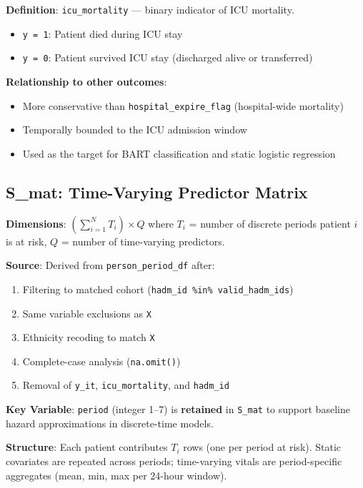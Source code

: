 \documentclass[11pt]{article}
\begin{document}
\textbf{Definition}: \texttt{icu\_mortality} --- binary indicator of ICU mortality.
\begin{itemize}[nosep]
    \item \texttt{y = 1}: Patient died during ICU stay
    \item \texttt{y = 0}: Patient survived ICU stay (discharged alive or transferred)
\end{itemize}

\textbf{Relationship to other outcomes}:
\begin{itemize}[nosep]
    \item More conservative than \texttt{hospital\_expire\_flag} (hospital-wide mortality)
    \item Temporally bounded to the ICU admission window
    \item Used as the target for BART classification and static logistic regression
\end{itemize}

\subsection{S\_mat: Time-Varying Predictor Matrix}

\textbf{Dimensions}: $\left(\sum_{i=1}^{N} T_i\right) \times Q$ where $T_i$ = number of discrete periods patient $i$ is at risk, $Q$ = number of time-varying predictors.

\textbf{Source}: Derived from \texttt{person\_period\_df} after:
\begin{enumerate}[nosep]
    \item Filtering to matched cohort (\texttt{hadm\_id \%in\% valid\_hadm\_ids})
    \item Same variable exclusions as \texttt{X}
    \item Ethnicity recoding to match \texttt{X}
    \item Complete-case analysis (\texttt{na.omit()})
    \item Removal of \texttt{y\_it}, \texttt{icu\_mortality}, and \texttt{hadm\_id}
\end{enumerate}

\textbf{Key Variable}: \texttt{period} (integer 1--7) is \textbf{retained} in \texttt{S\_mat} to support baseline hazard approximations in discrete-time models.

\textbf{Structure}: Each patient contributes $T_i$ rows (one per period at risk). Static covariates are repeated across periods; time-varying vitals are period-specific aggregates (mean, min, max per 24-hour window).
\end{document}
